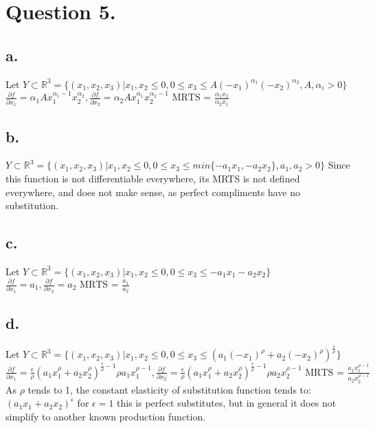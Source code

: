 \documentclass[10pt, letterpaper]{paper}
\begin{document}
\section*{ Question 5.}
\subsection*{a.}
Let $Y \subset \mathbb{R}^3 = \{ (x_1,x_2,x_3) | x_1,x_2 \leq 0, 0 \leq x_3 \leq A(-x_1)^{\alpha_1} (-x_2)^{\alpha_2} , A,\alpha_i > 0 \}$
\newline
$\frac{ \partial f }{\partial x_1 } = \alpha_1 A x_1^{\alpha_1 -1 } x_2^{\alpha_2}, \frac{ \partial f }{\partial x_2 } = \alpha_2 A x_1^{\alpha_1} x_2^{\alpha_2 -1} \text{ MRTS = } \frac{ \alpha_1 x_2 }{ \alpha_2 x_1 }$

\subsection*{b.}
$Y \subset \mathbb{R}^3 = \{ (x_1,x_2,x_3) | x_1,x_2 \leq 0, 0 \leq x_3 \leq min\{-a_1 x_1, -a_2 x_2 \}, a_1,a_2 > 0 \}$
\newline
Since this function is not differentiable everywhere, its MRTS is not defined everywhere, and does not make sense, as perfect compliments have no substitution.

\subsection*{c.}
Let $Y \subset \mathbb{R}^3 = \{ (x_1,x_2,x_3) | x_1,x_2 \leq 0, 0 \leq x_3 \leq -a_1 x_1 - a_2 x_2 \}$
\newline
$\frac{ \partial f }{\partial x_1 } = a_1 , \frac{ \partial f }{\partial x_2 } = a_2 \text{ MRTS = } \frac{ a_1 }{ a_2 }$

\subsection*{d.}
Let $Y \subset \mathbb{R}^3 = \{ (x_1,x_2,x_3) | x_1,x_2 \leq 0, 0 \leq x_3 \leq ( a_1 (-x_1)^\rho + a_2 (-x_2)^\rho )^\frac{ \epsilon }{\rho} \}$
\newline
$\frac{ \partial f }{\partial x_1 } = \frac{ \epsilon }{\rho} ( a_1 x_1^\rho + a_2 x_2^\rho )^{\frac{ \epsilon }{\rho} - 1} \rho a_1 x_1^{\rho-1}  , \frac{ \partial f }{\partial x_2 } = \frac{ \epsilon }{\rho} ( a_1 x_1^\rho + a_2 x_2^\rho )^{\frac{ \epsilon }{\rho} - 1} \rho a_2 x_2^{\rho-1} \text{ MRTS = } \frac{ a_1 x_1^{\rho-1} }{ a_2 x_2^{\rho-1} }$
\newline \newline
As $\rho$ tends to 1, the constant elasticity of substitution function tends to: $(a_1 x_1 + a_2 x_2 )^\epsilon$
for $\epsilon = 1$ this is perfect substitutes, but in general it does not simplify to another known production function.
\end{document}
